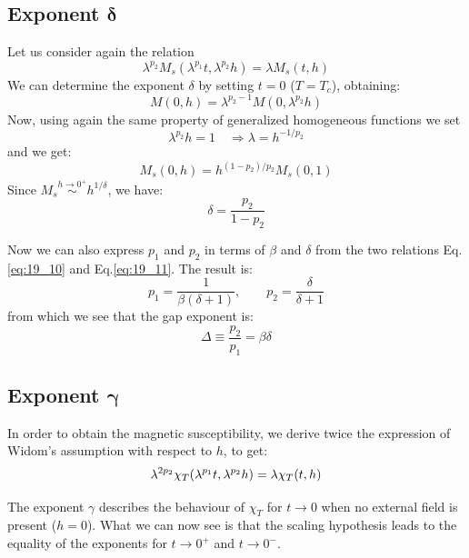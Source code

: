 \documentclass[../../Main/Main.tex]{subfiles}
\begin{document}
\subsection{Exponent \( \pmb{\delta}  \)}
Let us consider again the relation
\begin{equation*}
   \lambda ^{p_2} M_s ( \lambda ^{p_1} t, \lambda ^{p_2} h) = \lambda M_s (t,h)
\end{equation*}
We can determine the exponent \( \delta  \) by setting \( t=0 \) (\( T=T_c  \)), obtaining:
\begin{equation*}
  M(0,h) = \lambda ^{p_2-1} M (0, \lambda ^{p_2} h)
\end{equation*}
Now, using again the same property of generalized homogeneous functions we set
\begin{equation*}
  \lambda ^{p_2} h = 1 \quad \Rightarrow \lambda = h^{-1/p_2}
\end{equation*}
and we get:
\begin{equation*}
  M_s (0,h) =  h^{(1-p_2)/p_2} M_s (0,1)
\end{equation*}
Since \(  M_s  \overset{h \rightarrow 0^+}{\sim} h^{1/\delta } \), we have:
\begin{equation}
  \delta = \frac{p_2}{ 1 - p_2 }
  \label{eq:19_11}
\end{equation}

Now we can also express \( p_1 \) and \( p_2 \)  in terms of \( \beta  \) and \( \delta  \) from the two relations Eq.\eqref{eq:19_10} and Eq.\eqref{eq:19_11}. The result is:
\begin{equation}
  p_1 = \frac{1}{\beta (\delta +1)}, \qquad p_2 = \frac{\delta }{\delta + 1}
\end{equation}
from which we see that the gap exponent is:
\begin{equation}
  \Delta \equiv \frac{p_2}{p_1}  = \beta \delta
\end{equation}


\subsection{Exponent \( \pmb{\gamma  } \) }
In order to obtain the magnetic susceptibility, we derive twice the expression of Widom's assumption with respect to \( h \), to get:
\begin{equation*}
  \lambda ^{2p_2} \chi _T \qty(\lambda ^{p_1}t, \lambda ^{p_2}h) = \lambda \chi _T (t,h)
\end{equation*}

The exponent \( \gamma   \) describes the behaviour of \( \chi _T \)  for \( t \rightarrow 0 \)  when no external field is present (\( h=0 \)). What we can now see is that the scaling hypothesis leads to the equality of the exponents for \( t \rightarrow 0^+ \)  and \( t \rightarrow 0^- \).
\end{document}
